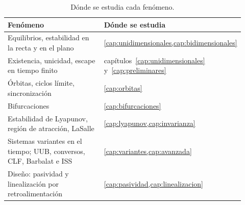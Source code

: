 \begin{table}[ht]
\centering\small
\begin{tabular}{@{}p{0.42\linewidth}p{0.5\linewidth}@{}}
\toprule
Fenómeno & Dónde se estudia\\
\midrule
Equilibrios, estabilidad en la recta y en el plano & \cref{cap:unidimensionales,cap:bidimensionales}\\
Existencia, unicidad, escape en tiempo finito & capítulos~\ref{cap:unidimensionales} y~\ref{cap:preliminares}\\
Órbitas, ciclos límite, sincronización & \cref{cap:orbitas}\\
Bifurcaciones & \cref{cap:bifurcaciones}\\
Estabilidad de Lyapunov, región de atracción, LaSalle & \cref{cap:lyapunov,cap:invarianza}\\
Sistemas variantes en el tiempo; UUB, conversos, CLF, Barbalat e ISS & \cref{cap:variantes,cap:avanzada}\\
Diseño: pasividad y linealización por retroalimentación & \cref{cap:pasividad,cap:linealizacion}\\
\bottomrule
\end{tabular}
\caption{Dónde se estudia cada fenómeno.}
\label{tab:in-mapa}
\end{table}
